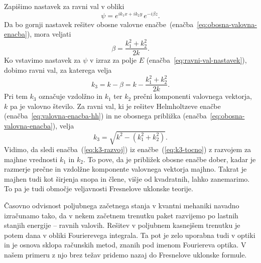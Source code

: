 Zapišimo nastavek za ravni val  v obliki
\begin{equation}
\psi=e^{ik_{1}x+ik_{2}y}\, e^{-i\beta z}.
\label{eq:ravni-val-nastavek-obosni}
\end{equation}
Da bo gornji nastavek rešitev
obosne valovne enačbe~(enačba~\ref{eq:obosna-valovna-enacba}), mora veljati 
\begin{equation}
\beta=\frac{k_{1}^{2}+k_{2}^{2}}{2k}.
\end{equation}
Ko vstavimo nastavek za $\psi$ v izraz za polje $E$ 
(enačba~\ref{eq:ravni-val-nastavek}), dobimo ravni val, za katerega velja 
\begin{equation}
k_{3}=k-\beta=k-\frac{k_{1}^{2}+k_{2}^{2}}{2k}.
\label{eq:k3-razvoj}
\end{equation}
Pri tem $k_{3}$ označuje vzdolžno in $k_{1}$ ter $k_{2}$ prečni komponenti valovnega 
vektorja, $k$ pa je valovno število. 
Za ravni val, ki je rešitev Helmholtzeve enačbe (enačba~\ref{eq:valovna-enacba-hh})
in ne obosnega približka (enačba~\ref{eq:obosna-valovna-enacba}), velja 
\begin{equation}
k_{3}=\sqrt{k^{2}-(k_{1}^{2}+k_{2}^{2})}.\label{eq:k3-tocno}
\end{equation}
Vidimo, da sledi enačba~(\ref{eq:k3-razvoj}) iz enačbe~(\ref{eq:k3-tocno})
z razvojem za majhne vrednosti $k_1$ in $k_2$. To pove, da je približek obosne 
enačbe dober, kadar je razmerje prečne in vzdolžne komponente valovnega vektorja 
majhno. Takrat je majhen tudi kot širjenja snopa in člene, višje od kvadratnih,
lahko zanemarimo. To pa je tudi območje veljavnosti Fresnelove uklonske
teorije.

\begin{remark}
Časovno odvisnost poljubnega začetnega
stanja v kvantni mehaniki navadno izračunamo tako, da v nekem začetnem
trenutku paket razvijemo po lastnih stanjih energije -- ravnih valovih.
Rešitev v poljubnem kasnejšem trenutku je potem dana v obliki Fourierevega
integrala. Ta pot je zelo uporabna tudi v optiki in je osnova sklopa
računskih metod, znanih pod imenom Fouriereva optika. V našem primeru
z njo brez težav pridemo nazaj do Fresnelove uklonske formule.
\end{remark}

